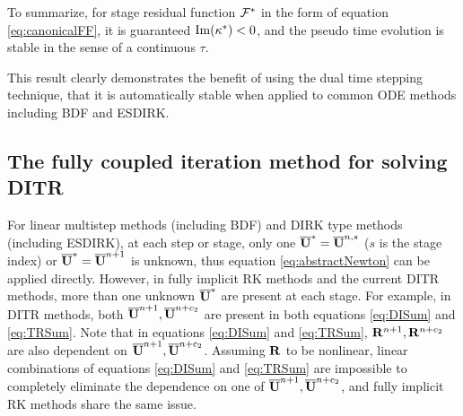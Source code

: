 \documentclass[preprint,12pt]{elsarticle}
\begin{document}
To summarize, for stage residual function $\mathcal{F}^*$ in the form of
equation \eqref{eq:canonicalFF}, it is guaranteed $\mathrm{Im} (\kappa^*) < 0$,
and the pseudo time evolution is stable in the sense of a continuous $\tau$.

This result clearly demonstrates the benefit of using the dual time stepping
technique,
that it is automatically stable when applied to common ODE methods including 
BDF and ESDIRK.


\subsection{The fully coupled iteration method for solving DITR}

For linear multistep methods (including BDF) and DIRK type methods (including ESDIRK), 
at each step or stage, only one $\overline{\mathbf{U}}^{*}=\overline{\mathbf{U}}^{n,s}$ 
($s$ is the stage index) or $\overline{\mathbf{U}}^{*}=\overline{\mathbf{U}}^{n+1}$ is unknown,
thus equation \eqref{eq:abstractNewton} can be applied directly.
However, in fully implicit RK methods and the current DITR methods,
more than one unknown $\overline{\mathbf{U}}^{*}$ are present at each stage.
For example, in DITR methods, both $\overline{\mathbf{U}}^{n+1},\overline{\mathbf{U}}^{n+c_2}$
are present in both equations \eqref{eq:DISum} and \eqref{eq:TRSum}.
Note that in equations \eqref{eq:DISum} and \eqref{eq:TRSum},
$\mathbf{R}^{n+1},\mathbf{R}^{n+c_2}$ are also dependent on $\overline{\mathbf{U}}^{n+1},\overline{\mathbf{U}}^{n+c_2}$.
Assuming $\mathbf{R}$ to be nonlinear, linear combinations of
equations \eqref{eq:DISum} and \eqref{eq:TRSum} are
impossible to completely eliminate
the dependence on one of $\overline{\mathbf{U}}^{n+1},\overline{\mathbf{U}}^{n+c_2}$, and
fully implicit RK methods share the same issue.
\end{document}
